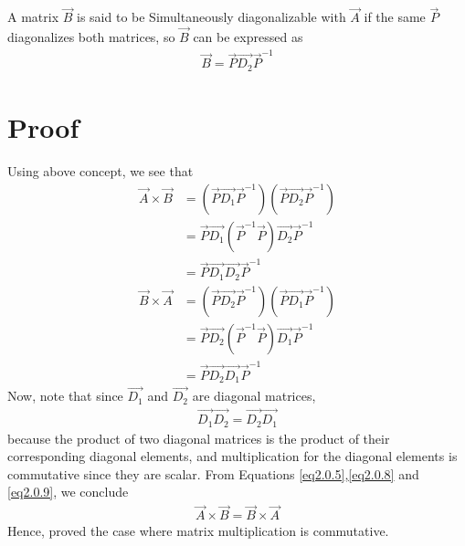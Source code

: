 \documentclass[journal,12pt,twocolumn]{IEEEtran}
\begin{document}
A matrix $\vec{B}$ is said to be Simultaneously diagonalizable with $\vec{A}$ if the same $\vec{P}$ diagonalizes both matrices, so $\vec{B}$ can be expressed as
\begin{align}\label{eq2}
    \vec{B} = \vec{P}\vec{D_2}\vec{P}^{-1}
\end{align}
\section{Proof}
Using above concept, we see that
\begin{align}
    \vec{A}\times\vec{B} & = (\vec{P}\vec{D_1}\vec{P}^{-1})(\vec{P}\vec{D_2}\vec{P}^{-1})\\& =\vec{P}\vec{D_1}(\vec{P}^{-1}\vec{P})\vec{D_2}\vec{P}^{-1}\\& = \label{eq2.0.5} \vec{P}\vec{D_1}\vec{D_2}\vec{P}^{-1}
\end{align}
\begin{align}
    \vec{B}\times\vec{A} & = (\vec{P}\vec{D_2}\vec{P}^{-1})(\vec{P}\vec{D_1}\vec{P}^{-1})\\& =\vec{P}\vec{D_2}(\vec{P}^{-1}\vec{P})\vec{D_1}\vec{P}^{-1}\\& = \label{eq2.0.8} \vec{P}\vec{D_2}\vec{D_1}\vec{P}^{-1}
\end{align}
Now, note that since $\vec{D_1}$ and $\vec{D_2}$ are diagonal matrices,
\begin{align}\label{eq2.0.9}
    \vec{D_1}\vec{D_2} = \vec{D_2}\vec{D_1}
\end{align}
because the product of two diagonal matrices is the product of their corresponding diagonal elements, and multiplication for the diagonal elements is commutative since they are scalar.
From Equations \eqref{eq2.0.5},\eqref{eq2.0.8} and \eqref{eq2.0.9}, we conclude
\begin{align}
    \vec{A}\times\vec{B} = \vec{B}\times\vec{A}
\end{align}
Hence, proved the case where matrix multiplication is commutative.
\end{document}
